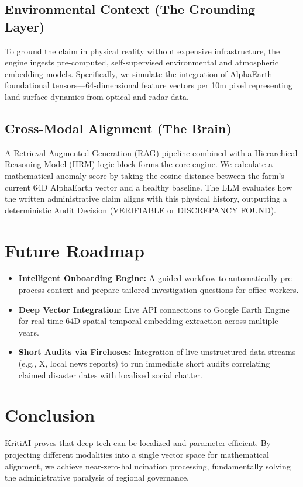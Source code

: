 \documentclass[12pt, a4paper]{article}
\begin{document}
\subsection{Environmental Context (The Grounding Layer)}
To ground the claim in physical reality without expensive infrastructure, the engine ingests pre-computed, self-supervised environmental and atmospheric embedding models. Specifically, we simulate the integration of AlphaEarth foundational tensors—64-dimensional feature vectors per 10m pixel representing land-surface dynamics from optical and radar data. 

\subsection{Cross-Modal Alignment (The Brain)}
A Retrieval-Augmented Generation (RAG) pipeline combined with a Hierarchical Reasoning Model (HRM) logic block forms the core engine. We calculate a mathematical anomaly score by taking the cosine distance between the farm's current 64D AlphaEarth vector and a healthy baseline. The LLM evaluates how the written administrative claim aligns with this physical history, outputting a deterministic Audit Decision (VERIFIABLE or DISCREPANCY FOUND).

\section{Future Roadmap}
\begin{itemize}
    \item \textbf{Intelligent Onboarding Engine:} A guided workflow to automatically pre-process context and prepare tailored investigation questions for office workers.
    \item \textbf{Deep Vector Integration:} Live API connections to Google Earth Engine for real-time 64D spatial-temporal embedding extraction across multiple years.
    \item \textbf{Short Audits via Firehoses:} Integration of live unstructured data streams (e.g., X, local news reports) to run immediate short audits correlating claimed disaster dates with localized social chatter.
\end{itemize}

\section{Conclusion}
KritiAI proves that deep tech can be localized and parameter-efficient. By projecting different modalities into a single vector space for mathematical alignment, we achieve near-zero-hallucination processing, fundamentally solving the administrative paralysis of regional governance.
\end{document}

